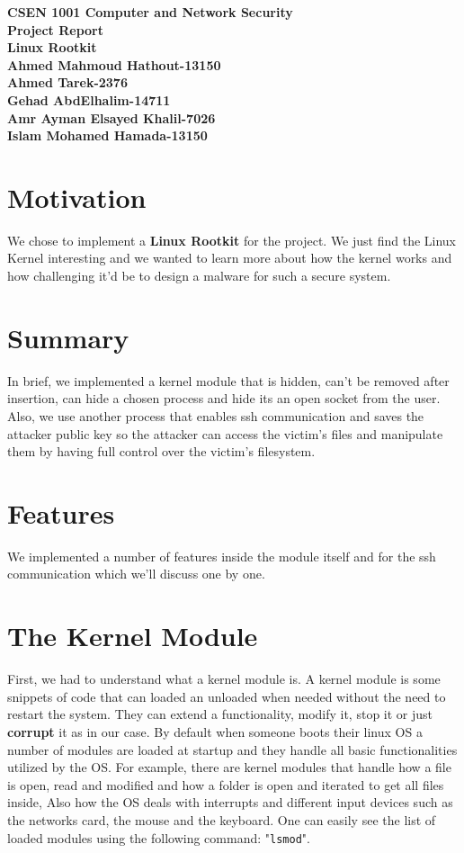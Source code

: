 \documentclass[12pt]{article}
\begin{document}
	\begin{titlepage}
		\Large
		\vspace*{2cm}
		\centering
		\textbf{CSEN 1001 Computer and Network Security}\\
		\vspace{1cm}
		\textbf{Project Report}\\
		\vspace{.5cm}
		\textbf{Linux Rootkit}\\
		\vspace{7cm}
		\normalsize
		\textbf{Ahmed Mahmoud Hathout-13150\\
				Ahmed Tarek-2376\\
				Gehad AbdElhalim-14711\\
				Amr Ayman Elsayed Khalil-7026\\
				Islam Mohamed Hamada-13150}
	\end{titlepage}
	\section{Motivation}
	We chose to implement a \textbf{Linux Rootkit} for the project. We just find the Linux Kernel interesting and we wanted to learn more about how the kernel works and how challenging it'd be to design a malware for such a secure system.
	\section{Summary}
	 In brief, we implemented a kernel module that is hidden, can't be removed after insertion, can hide a chosen process and hide its an open socket from the user. Also, we use another process that enables ssh communication and saves the attacker public key so the attacker can access the victim's files and manipulate them by having full control over the victim's filesystem.
	 \section{Features}
	 We implemented a number of features inside the module itself and for the ssh communication which we'll discuss one by one.
	 \section{The Kernel Module}
	 First, we had to understand what a kernel module is. A kernel module is some snippets of code that can loaded an unloaded when needed without the need to restart the system. They can extend a functionality, modify it, stop it or just \textbf{corrupt} it as in our case.
	 By default when someone boots their linux OS a number of modules are loaded at startup and they handle all basic functionalities utilized by the OS. For example, there are kernel modules that handle how a file is open, read and modified and how a folder is open and iterated to get all files inside, Also how the OS deals with interrupts and different input devices such as the networks card, the mouse and the keyboard. One can easily see the list of loaded modules using the following command: "\lstinline|lsmod|".
	 
\end{document}
